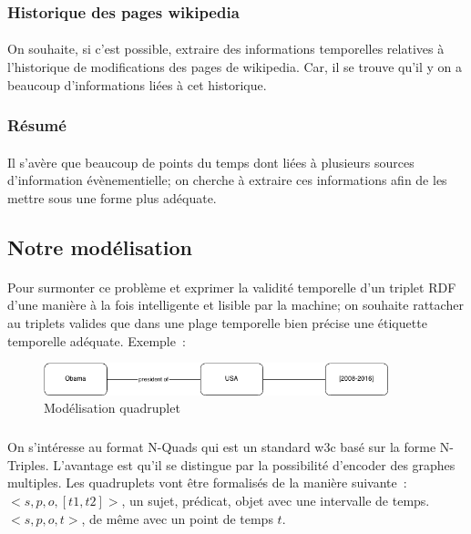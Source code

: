 \subsubsection*{Historique des pages wikipedia}
\paragraph{}
On souhaite, si c’est possible, extraire des informations temporelles relatives à l’historique de modifications des pages de wikipedia. Car, il se trouve qu’il y on a beaucoup d’informations liées à cet historique.
\subsubsection*{Résumé}
\paragraph{}
Il s'avère que beaucoup de points du temps dont liées à plusieurs sources d’information évènementielle; on cherche à extraire ces informations afin de les mettre sous une forme plus adéquate.
\subsection*{Notre modélisation}
\paragraph{}
Pour surmonter ce problème et exprimer la validité temporelle d’un triplet RDF d’une manière à la fois intelligente et lisible par la machine; on souhaite rattacher au triplets valides que dans une plage temporelle bien précise une étiquette temporelle adéquate.
\newline
Exemple~:
\begin{figure}[H]
        \centering
                \centering
                \includegraphics[width=10cm]{obamaQuad.png}
               \caption{Modélisation quadruplet}

\end{figure}
\subparagraph{}
On s'intéresse au format N-Quads qui est un standard w3c basé sur la forme N-Triples. L’avantage est qu’il se distingue par la possibilité d’encoder des graphes multiples.
Les quadruplets vont être formalisés de la manière suivante~:
\newline
$<s,p,o,[t1,t2]>$, un sujet, prédicat, objet avec une intervalle de temps.
\newline
$<s,p,o,t>$, de même avec un point de temps $t$.
